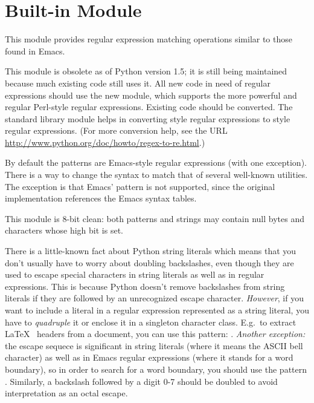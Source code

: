 \section{Built-in Module }
\label{module-regex}

This module provides regular expression matching operations similar to
those found in Emacs.

This module is obsolete as of Python version 1.5; it is still being
maintained because much existing code still uses it.  All new code in
need of regular expressions should use the new
 module, which supports the more powerful
and regular Perl-style regular expressions.  Existing code should be
converted.  The standard library module
 helps in converting
 style regular expressions to 
style regular expressions.  (For more conversion help, see the URL
\url{http://www.python.org/doc/howto/regex-to-re.html}.)

By default the patterns are Emacs-style regular expressions
(with one exception).  There is
a way to change the syntax to match that of several well-known
\UNIX{} utilities.  The exception is that Emacs' 
pattern is not supported, since the original implementation references
the Emacs syntax tables.

This module is 8-bit clean: both patterns and strings may contain null
bytes and characters whose high bit is set.

 There is a little-known fact about Python string
literals which means that you don't usually have to worry about
doubling backslashes, even though they are used to escape special
characters in string literals as well as in regular expressions.  This
is because Python doesn't remove backslashes from string literals if
they are followed by an unrecognized escape character.
\emph{However}, if you want to include a literal  in a
regular expression represented as a string literal, you have to
\emph{quadruple} it or enclose it in a singleton character class.
E.g.\  to extract \LaTeX\  headers from a document, you can use this pattern:
.  \emph{Another exception:}
the escape sequece  is significant in string literals
(where it means the ASCII bell character) as well as in Emacs regular
expressions (where it stands for a word boundary), so in order to
search for a word boundary, you should use the pattern .
Similarly, a backslash followed by a digit 0-7 should be doubled to
avoid interpretation as an octal escape.

